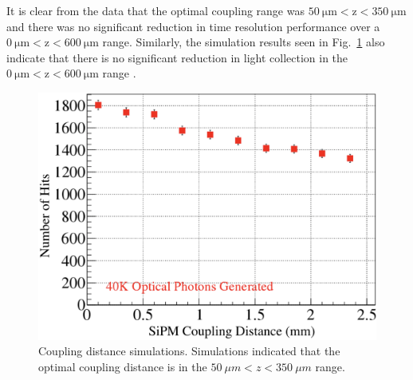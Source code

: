 It is clear from the data that the optimal coupling range was $\mathrm{50\ \mu m < z < 350\ \mu m}$ and there was no significant reduction in time resolution performance over a $\mathrm{0\ \mu m < z < 600\ \mu m}$ range.  Similarly, the simulation results seen in Fig.~\ref{fig:spacing_sim} also indicate that there is no significant reduction in light collection in the $\mathrm{0\ \mu m < z < 600\ \mu m}$ range \cite{puneet_sim_talk}.
	\begin{figure}[!htb]
		\centering
		\includegraphics[width=0.8\columnwidth]{misalignment/figs/spacing_sim}
		\caption{Coupling distance simulations. Simulations indicated that the optimal coupling distance is in the $50\ \mu m < z < 350\ \mu m$ range.}
		\label{fig:spacing_sim}
	\end{figure}